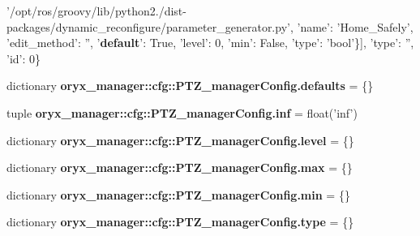 \begin{DoxyCompactItemize}
'/opt/ros/groovy/lib/python2./dist-\/packages/dynamic\-\_\-reconfigure/parameter\-\_\-generator.\-py', 'name'\-: '\-Home\-\_\-\-Safely', 'edit\-\_\-method'\-: '', '{\bf default}'\-: \-True, 'level'\-: 0, 'min'\-: \-False, 'type'\-: 'bool'\}], 'type'\-: '', 'id'\-: 0\}
\item 
dictionary {\bf oryx\-\_\-manager\-::cfg\-::\-P\-T\-Z\-\_\-manager\-Config.\-defaults} = \{\}
\item 
tuple {\bf oryx\-\_\-manager\-::cfg\-::\-P\-T\-Z\-\_\-manager\-Config.\-inf} = float('inf')
\item 
dictionary {\bf oryx\-\_\-manager\-::cfg\-::\-P\-T\-Z\-\_\-manager\-Config.\-level} = \{\}
\item 
dictionary {\bf oryx\-\_\-manager\-::cfg\-::\-P\-T\-Z\-\_\-manager\-Config.\-max} = \{\}
\item 
dictionary {\bf oryx\-\_\-manager\-::cfg\-::\-P\-T\-Z\-\_\-manager\-Config.\-min} = \{\}
\item 
dictionary {\bf oryx\-\_\-manager\-::cfg\-::\-P\-T\-Z\-\_\-manager\-Config.\-type} = \{\}
\end{DoxyCompactItemize}

